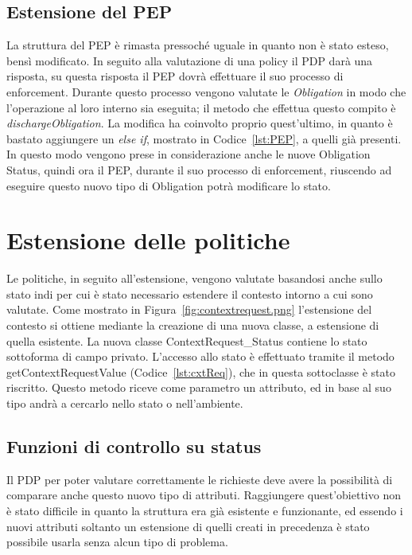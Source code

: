 \subsection{Estensione del PEP}
\label{sub:estensione_PEP}
La struttura del PEP è rimasta pressoché uguale in quanto non è stato esteso, bensì modificato.
In seguito alla valutazione di una policy il PDP darà una risposta, su questa risposta il PEP dovrà effettuare il suo processo di enforcement.
Durante questo processo vengono valutate le \textit{Obligation} in modo che l'operazione al loro interno sia eseguita; il metodo che effettua questo compito è 
\textit{dischargeObligation}. La modifica ha coinvolto proprio quest'ultimo, in quanto è bastato aggiungere un \textit{else if}, mostrato in Codice~\ref{lst:PEP}, a quelli già presenti.
In questo modo vengono prese in considerazione anche le nuove Obligation Status, quindi ora il PEP, durante il suo processo di enforcement, riuscendo ad eseguire questo nuovo tipo di Obligation potrà modificare lo stato.


\section{Estensione delle politiche}
\label{sec:estensione_politiche}

Le politiche, in seguito all'estensione, vengono valutate basandosi anche sullo stato indi per cui è stato necessario estendere il contesto intorno a cui sono valutate. Come mostrato in Figura~\ref{fig:contextrequest.png} l'estensione del contesto si ottiene mediante la creazione di una nuova classe, a estensione di quella esistente.
La nuova classe ContextRequest\_Status contiene lo stato sottoforma di campo privato. L'accesso allo stato è effettuato tramite il metodo getContextRequestValue (Codice~\ref{lst:cxtReq}), che in questa sottoclasse è stato riscritto.
Questo metodo riceve come parametro un attributo, ed in base al suo tipo andrà a cercarlo nello stato o nell'ambiente.

\subsection{Funzioni di controllo su status}
\label{sub:funzioni_controllo_status}

Il PDP per poter valutare correttamente le richieste deve avere la possibilità di comparare anche questo nuovo tipo di attributi.
Raggiungere quest'obiettivo non è stato difficile in quanto la struttura era già esistente e funzionante, ed essendo i nuovi attributi soltanto un estensione di quelli 
creati in precedenza è stato possibile usarla senza alcun tipo di problema.\par

